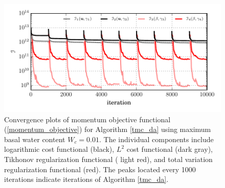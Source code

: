 \begin{figure}
  \centering
    \includegraphics[width=\linewidth]{images/internal_energy/jakob_results/inversion_Wc_0.01/convergence_plot.pdf}
  \caption[Jakobshavn simulation convergence plot]{Convergence plots of momentum objective functional (\ref{momentum_objective}) for Algorithm \ref{tmc_da} using maximum basal water content $W_c = 0.01$.  The individual components include logarithmic cost functional (black), $L^2$ cost functional ({\color[RGB]{128,128,128}dark gray}), Tikhonov regularization functional ({\color[RGB]{255,142,142} light red}), and total variation regularization functional ({\color[RGB]{255,0,0}red}). The peaks located every 1000 iterations indicate iterations of Algorithm \ref{tmc_da}.}
  \label{convergence}
\end{figure}


